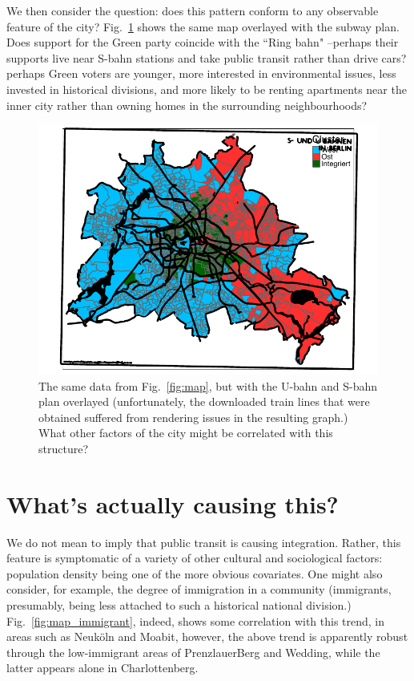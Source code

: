 \documentclass[amsmath,amssymb,nofootinbib,12pt,preprint]{revtex4}
\begin{document}
We then consider the question: does this pattern conform to any observable feature of the city? Fig.~\ref{fig:bahntrace} shows the same map overlayed with the subway plan. Does support for the Green party coincide with the ``Ring bahn" --perhaps their supports live near S-bahn stations and take public transit rather than drive cars? perhaps Green voters are younger, more interested in environmental issues, less invested in historical divisions, and more likely to be renting apartments near the inner city rather than owning homes in the surrounding neighbourhoods?

\begin{figure}[h]%
\includegraphics[scale=.85]{../figures/map_W_TRANSITTRACE}%
\caption{ The same data from Fig.~\ref{fig:map}, but with the U-bahn and S-bahn plan overlayed (unfortunately, the downloaded train lines that were obtained suffered from rendering issues in the resulting graph.) What other factors of the city might be correlated with this structure?}
\label{fig:bahntrace}%
\end{figure}

\clearpage

\section{What's actually causing this?}

We do not mean to imply that public transit is causing integration. Rather, this feature is symptomatic of a variety of other cultural and sociological factors: population density being one of the more obvious covariates. One might also consider, for example, the degree of immigration in a community (immigrants, presumably, being less attached to such a historical national division.) Fig.~\ref{fig:map_immigrant}, indeed, shows some correlation with this trend, in areas such as Neuk\"oln and Moabit, however, the above trend is apparently robust through the low-immigrant areas of PrenzlauerBerg and Wedding, while the latter appears alone in Charlottenberg.
\end{document}

